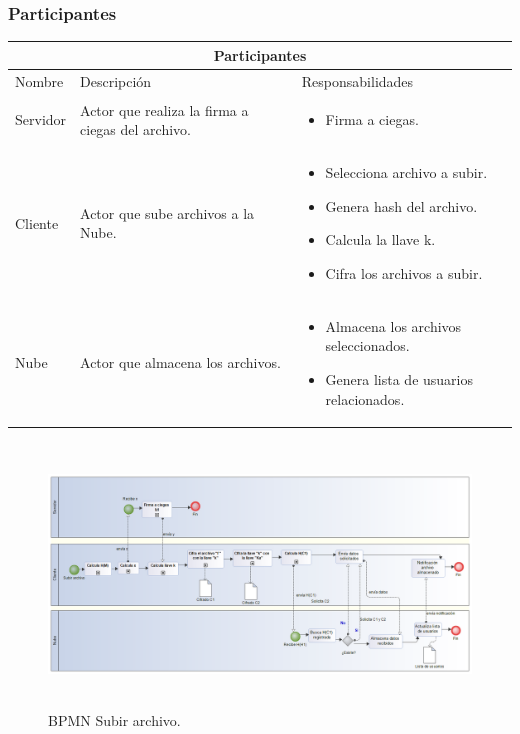\subsubsection{Participantes}

\begin{tabular}{ |p{2cm}|p{6cm}|p{6cm}| }
\hline
\multicolumn{3}{|c|}{ Participantes } \\
\hline

{ Nombre } & { Descripción } & { Responsabilidades} \\
\hline
{ Servidor } & Actor que realiza la firma a ciegas del archivo. & 
\begin{itemize} 
\item Firma a ciegas.

\end{itemize} \\ 
\hline
{ Cliente } & Actor que sube archivos a la Nube. & 
\begin{itemize} 
\item Selecciona archivo a subir.
\item Genera hash del archivo. 
\item Calcula la llave k.
\item Cifra los archivos a subir.
\end{itemize} \\ 
\hline
{ Nube } & Actor que almacena los archivos. & 
\begin{itemize} 
\item Almacena los archivos seleccionados.
\item Genera lista de usuarios relacionados.
\end{itemize} \\ 
\hline
\end{tabular}


\begin{figure}[H]
\centering
\includegraphics[width=17cm, height=7cm]{./images/BPM_Subir.png}
\caption{BPMN Subir archivo.}

\end{figure}


